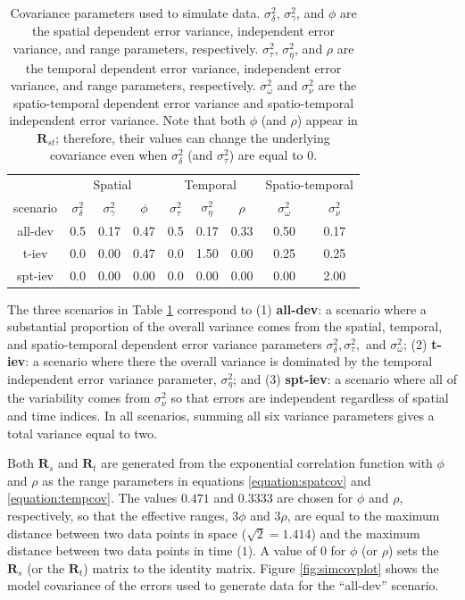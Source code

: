 \documentclass[smallextended]{svjour3}       %
\begin{document}
\begin{table}[H]

\caption{\label{tab:simparmtab}Covariance parameters used to simulate data. $\sigma^2_{\delta}$, $\sigma^2_{\gamma}$, and $\phi$ are the spatial dependent error variance, independent error variance, and range parameters, respectively. $\sigma^2_{\tau}$, $\sigma^2_{\eta}$, and $\rho$ are the temporal dependent error variance, independent error variance, and range parameters, respectively. $\sigma^2_{\omega}$ and $\sigma^2_{\nu}$ are the spatio-temporal dependent error variance and spatio-temporal independent error variance. Note that both $\phi$ (and $\rho$) appear in $\mathbf{R}_{st}$; therefore, their values can change the underlying covariance even when $\sigma^2_{\delta}$ (and $\sigma^2_{\tau}$) are equal to 0.}
\centering
\begin{tabular}[t]{ccccccccc}
\toprule
\multicolumn{1}{c}{ } & \multicolumn{3}{c}{Spatial} & \multicolumn{3}{c}{Temporal} & \multicolumn{2}{c}{Spatio-temporal} \\
\cmidrule(l{3pt}r{3pt}){2-4} \cmidrule(l{3pt}r{3pt}){5-7} \cmidrule(l{3pt}r{3pt}){8-9}
scenario & $\sigma^2_{\delta}$ & $\sigma^2_{\gamma}$ & $\phi$ & $\sigma^2_{\tau}$ & $\sigma^2_{\eta}$ & $\rho$ & $\sigma^2_{\omega}$ & $\sigma^2_{\nu}$\\
\midrule
all-dev & 0.5 & 0.17 & 0.47 & 0.5 & 0.17 & 0.33 & 0.50 & 0.17\\
t-iev & 0.0 & 0.00 & 0.47 & 0.0 & 1.50 & 0.00 & 0.25 & 0.25\\
spt-iev & 0.0 & 0.00 & 0.00 & 0.0 & 0.00 & 0.00 & 0.00 & 2.00\\
\bottomrule
\end{tabular}
\end{table}

The three scenarios in Table \ref{tab:simparmtab} correspond to (1)
\textbf{all-dev}: a scenario where a substantial proportion of the
overall variance comes from the spatial, temporal, and spatio-temporal
dependent error variance parameters
\(\sigma^2_{\delta}, \sigma^2_{\tau},\) and \(\sigma^2_{\omega}\); (2)
\textbf{t-iev}: a scenario where there the overall variance is dominated
by the temporal independent error variance parameter,
\(\sigma^2_{\eta}\); and (3) \textbf{spt-iev}: a scenario where all of
the variability comes from \(\sigma^2_{\nu}\) so that errors are
independent regardless of spatial and time indices. In all scenarios,
summing all six variance parameters gives a total variance equal to two.

Both \(\mathbf{R}_{s}\) and \(\mathbf{R}_t\) are generated from the
exponential correlation function with \(\phi\) and \(\rho\) as the range
parameters in equations \ref{equation:spatcov} and
\ref{equation:tempcov}. The values \(0.471\) and \(0.3333\) are chosen
for \(\phi\) and \(\rho\), respectively, so that the effective ranges,
\(3 \phi\) and \(3 \rho\), are equal to the maximum distance between two
data points in space (\(\sqrt2 = 1.414\)) and the maximum distance
between two data points in time (\(1\)). A value of 0 for \(\phi\) (or
\(\rho\)) sets the \(\mathbf{R}_{s}\) (or the \(\mathbf{R}_t\)) matrix
to the identity matrix. Figure \ref{fig:simcovplot} shows the model
covariance of the errors used to generate data for the ``all-dev''
scenario.
\end{document}
